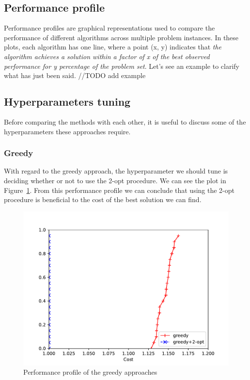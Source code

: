 \documentclass{article}
\begin{document}
\subsection{Performance profile}
Performance profiles are graphical representations used to compare the performance of different algorithms
across multiple problem instances.
In these plots, each algorithm has one line, where a point (x, y) indicates that \textit{the algorithm achieves a solution within
a factor of x of the best observed performance for y percentage of the problem set}.
Let's see an example to clarify what has just been said. //TODO add example


\subsection{Hyperparameters tuning}
Before comparing the methods with each other, it is useful to discuss some
of the hyperparameters these approaches require.

\subsubsection{Greedy}
With regard to the greedy approach, the hyperparameter we should tune is
deciding whether or not to use the 2-opt procedure. We can see the plot
in Figure~\ref{fig:ht_greedy}. From this performance profile we can conclude
that using the 2-opt procedure is beneficial to the cost of the best
solution we can find.

\begin{figure}[ht]
        \caption{Performance profile of the greedy approaches}
        \label{fig:ht_greedy}
        \centering
        \includegraphics[width=340pt]{assets/ht_greedy.pdf}
\end{figure}
\end{document}
